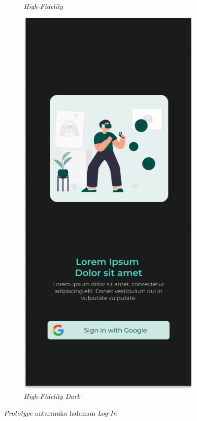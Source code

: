 \begin{figure}[H]
\begin{subfigure}[b]{0.3\textwidth}
	  \caption{\textit{High-Fidelity}}
	  \label{fig:hiFi-login}
	\end{subfigure}
	\begin{subfigure}[b]{0.3\textwidth}
		\centering
	  \includegraphics[width=\linewidth]{contents/chapter-3/images/HF-login-dt.png}
	  \caption{\textit{High-Fidelity Dark}}
	  \label{fig:hiFi-login-dt}
	\end{subfigure}
	\centering
	\label{fig:FeatureSetSignIn}
	\caption[short]{\textit{Prototype} antarmuka halaman \textit{Log-In}}
\end{figure}
